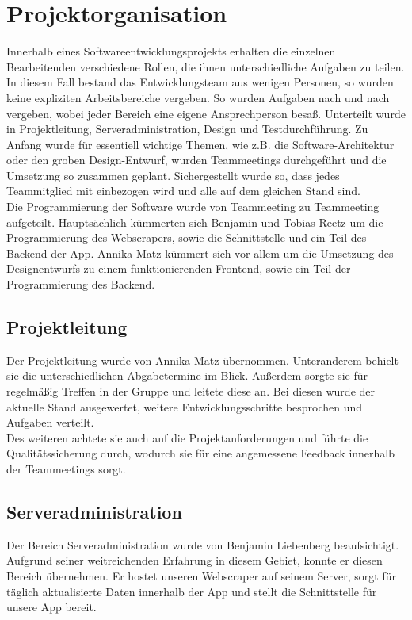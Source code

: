 \documentclass[conference]{IEEEtran}
\begin{document}
\section{Projektorganisation}
Innerhalb eines Softwareentwicklungsprojekts erhalten die einzelnen Bearbeitenden verschiedene Rollen, die ihnen unterschiedliche Aufgaben zu teilen. In diesem Fall bestand das Entwicklungsteam aus wenigen Personen, so wurden keine expliziten Arbeitsbereiche vergeben.  So wurden Aufgaben nach und nach vergeben, wobei jeder Bereich eine eigene Ansprechperson besaß. Unterteilt wurde in Projektleitung, Serveradministration, Design und Testdurchführung. Zu Anfang wurde für essentiell wichtige Themen, wie z.B. die Software-Architektur oder den groben Design-Entwurf, wurden Teammeetings durchgeführt und die Umsetzung so zusammen geplant. Sichergestellt wurde so, dass jedes Teammitglied mit einbezogen wird und alle auf dem gleichen Stand sind. \\
Die Programmierung der Software wurde von Teammeeting zu Teammeeting aufgeteilt. Hauptsächlich kümmerten sich Benjamin und Tobias Reetz um die Programmierung des Webscrapers, sowie die Schnittstelle und ein Teil des Backend der App. Annika Matz kümmert sich vor allem um die Umsetzung des Designentwurfs zu einem funktionierenden Frontend, sowie ein Teil der Programmierung des Backend.

\subsection{Projektleitung}
Der Projektleitung wurde von Annika Matz übernommen. Unteranderem behielt sie die unterschiedlichen Abgabetermine im Blick. Außerdem sorgte sie für regelmäßig Treffen in der Gruppe und leitete diese an. Bei diesen wurde der aktuelle Stand ausgewertet, weitere Entwicklungsschritte besprochen und Aufgaben verteilt. \\
Des weiteren achtete sie auch auf die Projektanforderungen und führte die Qualitätssicherung durch, wodurch sie für eine angemessene Feedback innerhalb der Teammeetings sorgt.

\subsection{Serveradministration}
Der Bereich Serveradministration wurde von Benjamin Liebenberg beaufsichtigt. Aufgrund seiner weitreichenden Erfahrung in diesem Gebiet, konnte er diesen Bereich übernehmen. Er hostet unseren Webscraper auf seinem Server, sorgt für täglich aktualisierte Daten innerhalb der App und stellt die Schnittstelle für unsere App bereit.
\end{document}
